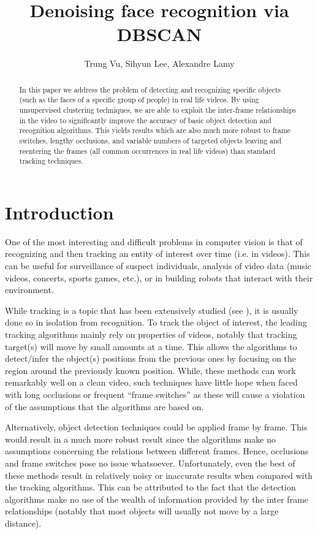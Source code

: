 \documentclass{article}
\title{Denoising face recognition via DBSCAN}
\author{Trung Vu, Sihyun Lee, Alexandre Lamy%
}
\begin{document}

\maketitle

\begin{abstract}
  In this paper we address the problem of detecting and recognizing specific objects (such as the faces of a specific group of people)
  in real life videos. By using unsupervised clustering techniques, we are able to exploit the inter-frame relationships in the
  video to significantly improve the accuracy of basic object detection and recognition algorithms. This yields results which are
  also much more robust to frame switches, lengthy occlusions, and variable numbers of targeted objects leaving and reentering the frames
  (all common occurrences in real life videos) than standard tracking techniques.
\end{abstract}

\section{Introduction}



One of the most interesting and difficult problems in computer vision is that of recognizing and then tracking an
entity of interest over time (i.e. in videos). This can be useful for surveillance of suspect individuals,
analysis of video data (music videos, concerts, sports games, etc.), or in building robots that interact with their
environment.

While tracking is a topic that has been extensively studied (see \cite{benchmarksurvey}), it is usually
done so in isolation from recognition. To track the object of interest, the leading tracking algorithms mainly rely on
properties of videos, notably that tracking target(s)
will move by small amounts at a time. This allows the algorithms to detect/infer the object(s) positions from the previous ones by
focusing on the region around the previously known position. While, these methods can work remarkably well on a clean video, such techniques have
little hope when faced with long occlusions or frequent ``frame switches'' as these will cause a violation of the assumptions that the algorithms are based on.

Alternatively, object detection techniques could be applied frame by frame. This would result in a much more robust result since the algorithms
make no assumptions concerning the relations between different frames. Hence, occlusions and frame switches pose no issue whatsoever. Unfortunately, even
the best of these methods result in relatively noisy or inaccurate results when compared with the tracking algorithms. This can be attributed to the fact that the detection
algorithms make no use of the wealth of information provided by the inter frame relationships (notably that most objects will usually not move by a large distance).
\end{document}
